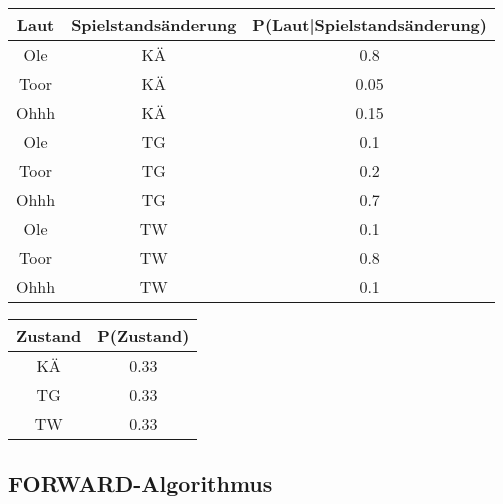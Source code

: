 \documentclass[a4paper]{article}
\begin{document}
\begin{tabular}{|c|c|c|}
\hline
Laut & Spielstandsänderung & P(Laut|Spielstandsänderung) \\\hline
Ole & KÄ & 0.8 \\
Toor & KÄ & 0.05 \\
Ohhh & KÄ & 0.15 \\\hline
Ole & TG & 0.1 \\
Toor & TG & 0.2 \\
Ohhh & TG & 0.7 \\\hline
Ole & TW & 0.1 \\
Toor & TW & 0.8 \\
Ohhh & TW & 0.1 \\\hline
\end{tabular}

\begin{tabular}{|c|c|}
\hline
Zustand & P(Zustand) \\\hline
KÄ & 0.33 \\
TG & 0.33 \\
TW & 0.33 \\\hline
\end{tabular}

\subsection{FORWARD-Algorithmus}
\end{document}
